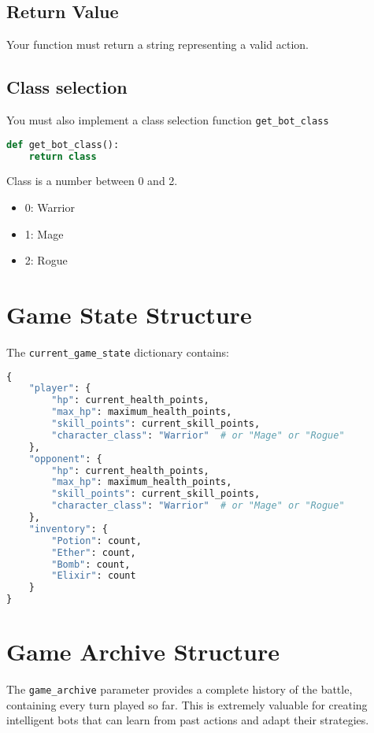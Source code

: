 \documentclass[12pt]{article}
\begin{document}
\subsection{Return Value}
Your function must return a string representing a valid action.

\subsection{Class selection}
You must also implement a class selection function \texttt{get\_bot\_class}

\begin{lstlisting}[language=Python, caption=Bot Function Signature]
def get_bot_class():
    return class
\end{lstlisting}

Class is a number between 0 and 2. 
\begin{itemize}
    \item 0: Warrior
    \item 1: Mage
    \item 2: Rogue
\end{itemize}

\section{Game State Structure}
\label{sec:game-state}

The \texttt{current\_game\_state} dictionary contains:

\begin{lstlisting}[language=Python, caption=Game State Structure]
{
    "player": {
        "hp": current_health_points,
        "max_hp": maximum_health_points,
        "skill_points": current_skill_points,
        "character_class": "Warrior"  # or "Mage" or "Rogue"
    },
    "opponent": {
        "hp": current_health_points,
        "max_hp": maximum_health_points,
        "skill_points": current_skill_points,
        "character_class": "Warrior"  # or "Mage" or "Rogue"
    },
    "inventory": {
        "Potion": count,
        "Ether": count,
        "Bomb": count,
        "Elixir": count
    }
}
\end{lstlisting}

\section{Game Archive Structure}
\label{sec:game-archive}

The \texttt{game\_archive} parameter provides a complete history of the battle, containing every turn played so far. This is extremely valuable for creating intelligent bots that can learn from past actions and adapt their strategies.
\end{document}
